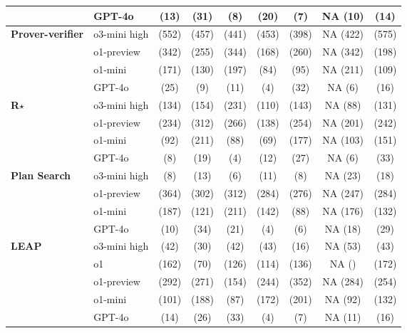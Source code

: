 \begin{table}[H]
\begin{tabular}{llccccccc}
& GPT-4o & \X (13) & \X (31) & \X (8) & \X (20) & \X (7) & NA (10) & \X (14)\\
\midrule
\textbf{Prover-verifier} & o3-mini high & \X (552) & \X (457) & \X (441) & \X (453) & \X (398) & NA (422) & \X (575) \\
& o1-preview & \X (342) & \X (255) & \X (344) & \X (168) & \X (260) & NA (342) & \X (198)\\
& o1-mini & \X (171) & \X (130) & \X (197) & \X (84) & \X (95) & NA (211) & \X (109)\\
& GPT-4o & \X (25) & \X (9) & \X (11) & \X (4) & \X (32) & NA (6) & \X (16)\\
\midrule
\textbf{R$\star$} & o3-mini high & \X (134) & \X (154) & \X (231) & \X (110) & \X (143) & NA (88) & \X (131) \\
& o1-preview & \X (234) & \X (312) & \X (266) & \X (138) & \X (254) & NA (201) & \X (242)\\
& o1-mini & \X (92) & \X (211) & \X (88) & \X (69) & \X (177) & NA (103) & \X (151)\\
& GPT-4o & \X (8) & \X (19) & \X (4) & \X (12) & \X (27) & NA (6) & \X (33)\\
\midrule
\textbf{Plan Search} & o3-mini high & \F (8) & \F (13) & \F (6) & \F (11) & \F (8) & NA (23) & \F (18) \\
& o1-preview & \X (364) & \X (302) & \X (312) & \X (284) & \X (276) & NA (247) & \X (284)\\
& o1-mini & \X (187) & \X (121) & \X (211) & \X (142) & \X (88) & NA (176) & \X (132)\\
& GPT-4o & \X (10) & \X (34) & \X (21) & \X (4) & \X (6) & NA (18) & \X (29)\\
\midrule
\textbf{LEAP} 
& o3-mini high & \C (42) & \X (30) & \X (42) & \X (43) & \X (16) & NA (53) & \X (43) \\
& o1 & \X (162) & \X (70) & \X (126) & \C (114) & \X (136) & NA () & \X (172) \\
& o1-preview & \X (292) & \X (271) & \X (154) & \X (244) & \X (352) & NA (284) & \X (254)\\
& o1-mini & \X (101) & \X (188) & \X (87) & \X (172) & \X (201) & NA (92) & \X (132)\\
& GPT-4o & \X (14) & \X (26) & \X (33) & \X (4) & \X (7) & NA (11) & \X (16)\\
\bottomrule
\end{tabular}
\label{tab:IMO2023SL_combinatorics_method_model_answer_matrix}
\end{table}





